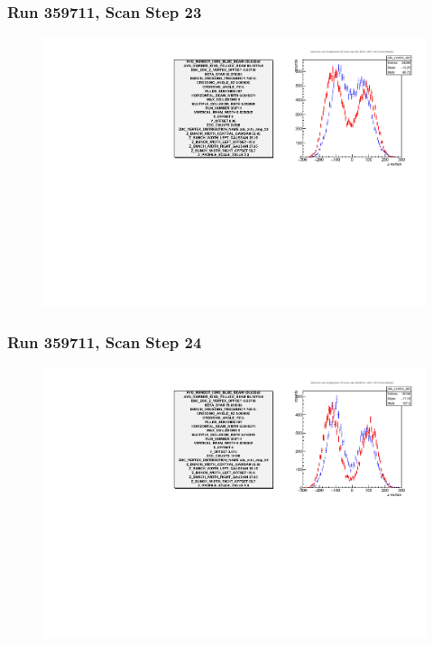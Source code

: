 \begin{frame}
\frametitle{Run 359711, Scan Step 23}
\begin{figure}
\begin{center}
\includegraphics[width=\linewidth]{"figs/359711_step_23_zdc_zvertex"}
\caption{ }
\label{fig:359711_step_23_zdc_zvertex}
\end{center}\end{figure}
\end{frame}

\begin{frame}
\frametitle{Run 359711, Scan Step 24}
\begin{figure}
\begin{center}
\includegraphics[width=\linewidth]{"figs/359711_step_24_zdc_zvertex"}
\caption{ }
\label{fig:359711_step_24_zdc_zvertex}
\end{center}\end{figure}
\end{frame}

